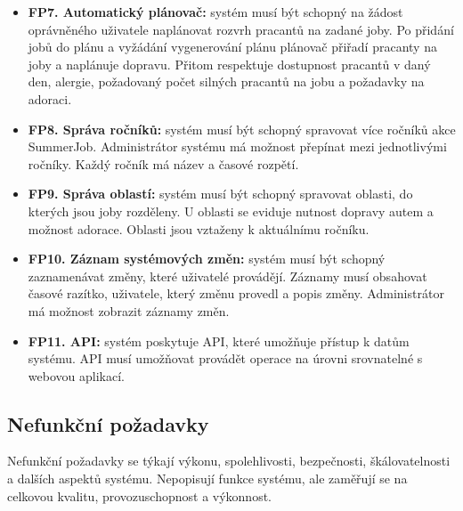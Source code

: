 \begin{itemize}
    \item \textbf{FP7. Automatický plánovač:} systém musí být schopný na žádost oprávněného uživatele naplánovat rozvrh pracantů na zadané joby. Po přidání jobů do plánu a vyžádání vygenerování plánu plánovač přiřadí pracanty na joby a naplánuje dopravu. Přitom respektuje dostupnost pracantů v daný den, alergie, požadovaný počet silných pracantů na jobu a požadavky na adoraci.
    \item \textbf{FP8. Správa ročníků:} systém musí být schopný spravovat více ročníků akce SummerJob. Administrátor systému má možnost přepínat mezi jednotlivými ročníky. Každý ročník má název a časové rozpětí.
    \item \textbf{FP9. Správa oblastí:} systém musí být schopný spravovat oblasti, do kterých jsou joby rozděleny. U oblasti se eviduje nutnost dopravy autem a možnost adorace. Oblasti jsou vztaženy k aktuálnímu ročníku.
    \item \textbf{FP10. Záznam systémových změn:} systém musí být schopný zaznamenávat změny, které uživatelé provádějí. Záznamy musí obsahovat časové razítko, uživatele, který změnu provedl a popis změny. Administrátor má možnost zobrazit záznamy změn.
    \item \textbf{FP11. API:} systém poskytuje API, které umožňuje přístup k datům systému. API musí umožňovat provádět operace na úrovni srovnatelné s webovou aplikací.
\end{itemize}

\subsection{Nefunkční požadavky}

Nefunkční požadavky se týkají výkonu, spolehlivosti, bezpečnosti, škálovatelnosti a dalších aspektů systému. Nepopisují funkce systému, ale zaměřují se na celkovou kvalitu, provozuschopnost a výkonnost.

